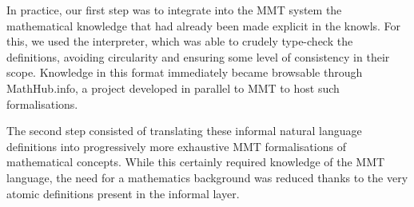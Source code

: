 In practice, our first step was to integrate into the MMT system the mathematical knowledge that had already been made explicit in the knowls. For this, we used the \stex interpreter, which was able to crudely type-check the definitions, avoiding circularity and ensuring some level of consistency in their scope. Knowledge in this format immediately became browsable through \textsf{MathHub.info}, a project developed in parallel to MMT to host such formalisations. 

The second step consisted of translating these informal natural language definitions into progressively more exhaustive MMT formalisations of mathematical concepts. While this certainly required knowledge of the MMT language, the need for a mathematics background was reduced thanks to the very atomic definitions present in the informal layer.  